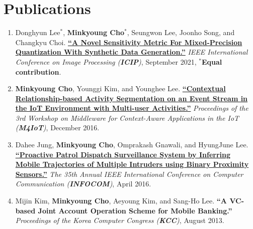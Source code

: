 \documentclass[letterpaper,oneside,11pt]{article}
\begin{document}
\section{Publications}
\begin{enumerate}[leftmargin=*, itemsep=0em]
  \item \small Donghyun Lee$^\ast$, \textbf{Minkyoung Cho$^\ast$}, Seungwon Lee, Joonho Song, and Changkyu Choi.  \textbf{\href{https://ieeexplore.ieee.org/abstract/document/9506527}{``A Novel Sensitivity Metric For Mixed-Precision Quantization With Synthetic Data Generation.''}} \textit{IEEE International Conference on Image Processing (\textbf{ICIP})}, September 2021, $^\ast$\textbf{Equal contribution}.
  \item \small \textbf{Minkyoung Cho}, Younggi Kim, and Younghee Lee. \textbf{\href{https://dl.acm.org/doi/10.1145/3008631.3008633}{``Contextual Relationship-based Activity Segmentation on an Event Stream in the IoT Environment with Multi-user Activities.''}} \textit{Proceedings of the 3rd Workshop on Middleware for Context-Aware Applications in the IoT (\textbf{M4IoT})}, December 2016.
  \item \small Dahee Jung, \textbf{Minkyoung Cho}, Omprakash Gnawali, and HyungJune Lee. \textbf{\href{https://ieeexplore.ieee.org/abstract/document/7524369}{``Proactive Patrol Dispatch Surveillance System by Inferring Mobile Trajectories of Multiple Intruders using Binary Proximity Sensors.''}} \textit{The 35th Annual IEEE International Conference on Computer Communication (\textbf{INFOCOM})}, April 2016.
  \item \small Mijin Kim, \textbf{Minkyoung Cho}, Aeyoung Kim, and Sang-Ho Lee. \textbf{``A VC-based Joint Account Operation Scheme for Mobile Banking.''} \textit{Proceedings of the Korea Computer Congress (\textbf{KCC})}, August 2013.
\end{enumerate}

\end{document}
